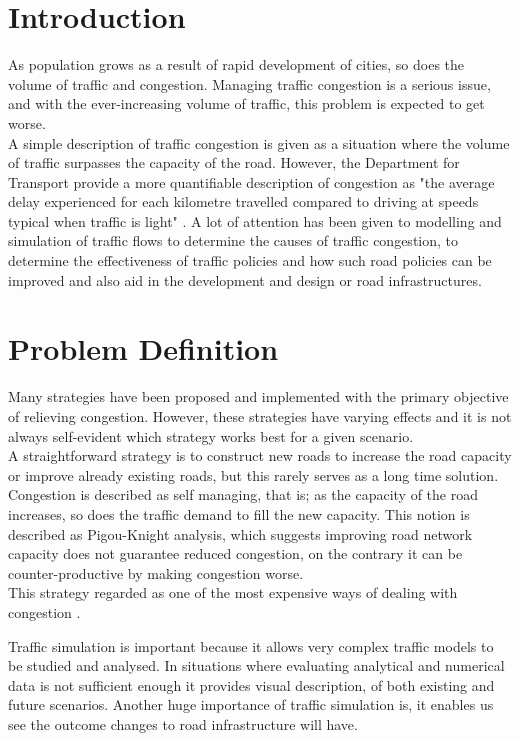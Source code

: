 \section{Introduction}
As population grows as a result of rapid development of cities, so does the volume of traffic and congestion.
Managing traffic congestion is a serious issue, and  with the ever-increasing volume of traffic, this problem is expected to get worse.\\
A simple description of traffic congestion is given as a situation where the volume of traffic surpasses the capacity of the road. However, the Department for Transport provide a more quantifiable description of congestion as "the average delay experienced for each kilometre travelled compared to driving at speeds typical when traffic is light" \cite{2}.
A lot of attention has been given to modelling and simulation of traffic flows to determine the causes of traffic congestion, to determine the effectiveness of traffic policies  and how such road policies can be improved and also aid in the development and design or road infrastructures.

\section*{Problem Definition}
Many strategies have been proposed and implemented with the primary objective of relieving congestion. However, these strategies have varying effects and it is not always self-evident which strategy works best for a given scenario.\\
A straightforward strategy is to construct new roads to increase the road capacity or improve already existing roads, but  this rarely serves as a long time solution.
Congestion is described as self managing, that is; as the capacity of the road increases, so does the traffic demand to fill the new capacity. This notion is described as Pigou-Knight analysis, which suggests improving road network capacity does not guarantee reduced congestion, on the contrary it can be counter-productive by making congestion worse\cite{1,2}. \\ This strategy regarded as one of the most expensive ways of dealing with congestion \cite{2}.
\par{}
Traffic simulation is important because it allows very complex traffic models to be studied and analysed. In situations where evaluating analytical and numerical data is not sufficient enough it provides visual description, of both existing and future scenarios.
Another huge importance of traffic simulation is, it enables us see the outcome changes to road infrastructure will have.

